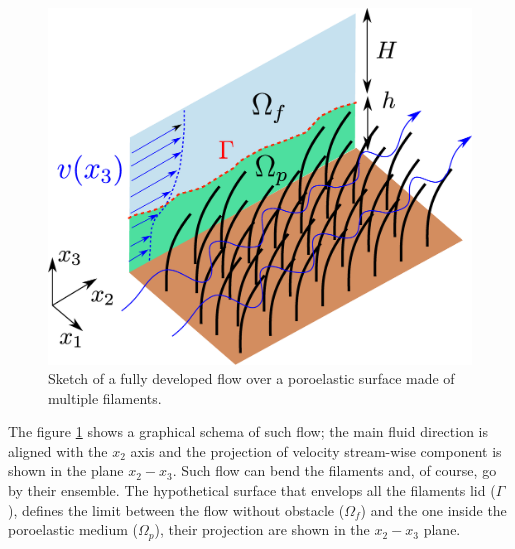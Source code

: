 \begin{figure}[h]
	\centering
	\includegraphics[width=0.7\linewidth]{chapter_1/problem_schema}
	\caption{Sketch of a fully developed flow over a poroelastic surface made of multiple filaments.}
	\label{fig:schema_problem}
\end{figure}

The figure \ref{fig:schema_problem} shows a graphical schema of such flow; the main fluid direction is aligned with the $x_2$ axis and the projection of velocity stream-wise component is shown in the plane $x_2 - x_3$.
Such flow can bend the filaments and, of course, go by their ensemble.
The hypothetical surface that envelops all the filaments lid ($\Gamma$), defines the limit between the flow without obstacle ($\Omega_{f}$) and the one inside the poroelastic medium ($\Omega_{p}$), their projection are shown in the  $x_2 - x_3$ plane.

